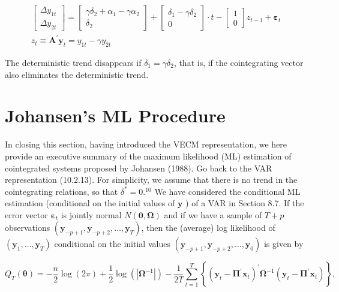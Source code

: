 \documentclass[10pt]{article}
\begin{document}
\begin{gather*}
{\left[\begin{array}{l}
\Delta y_{1 t} \\
\Delta y_{2 t}
\end{array}\right]=\left[\begin{array}{c}
\gamma \delta_{2}+\alpha_{1}-\gamma \alpha_{2} \\
\delta_{2}
\end{array}\right]+\left[\begin{array}{c}
\delta_{1}-\gamma \delta_{2} \\
0
\end{array}\right] \cdot t-\left[\begin{array}{l}
1 \\
0
\end{array}\right] z_{t-1}+\boldsymbol{\varepsilon}_{t}} \\
z_{t} \equiv \mathbf{A}^{\prime} \mathbf{y}_{t}=y_{1 t}-\gamma y_{2 t} \tag{10.2.32}
\end{gather*}


The deterministic trend disappears if $\delta_{1}=\gamma \delta_{2}$, that is, if the cointegrating vector also eliminates the deterministic trend.

\section*{Johansen's ML Procedure}
In closing this section, having introduced the VECM representation, we here provide an executive summary of the maximum likelihood (ML) estimation of cointegrated systems proposed by Johansen (1988). Go back to the VAR representation (10.2.13). For simplicity, we assume that there is no trend in the cointegrating relations, so that $\delta^{*}=0 .^{10}$ We have considered the conditional ML estimation (conditional on the initial values of $\mathbf{y}$ ) of a VAR in Section 8.7. If the error vector $\boldsymbol{\varepsilon}_{t}$ is jointly normal $N(\mathbf{0}, \boldsymbol{\Omega})$ and if we have a sample of $T+p$ observations $\left(\mathbf{y}_{-p+1}, \mathbf{y}_{-p+2}, \ldots, \mathbf{y}_{T}\right)$, then the (average) log likelihood of $\left(\mathbf{y}_{1}, \ldots, \mathbf{y}_{T}\right)$ conditional on the initial values $\left(\mathbf{y}_{-p+1}, \mathbf{y}_{-p+2}, \ldots, \mathbf{y}_{0}\right)$ is given by


\begin{equation*}
Q_{T}(\boldsymbol{\theta})=-\frac{n}{2} \log (2 \pi)+\frac{1}{2} \log \left(\left|\boldsymbol{\Omega}^{-1}\right|\right)-\frac{1}{2 T} \sum_{t=1}^{T}\left\{\left(\mathbf{y}_{t}-\boldsymbol{\Pi}^{\prime} \mathbf{x}_{t}\right)^{\prime} \boldsymbol{\Omega}^{-1}\left(\mathbf{y}_{t}-\boldsymbol{\Pi}^{\prime} \mathbf{x}_{t}\right)\right\}, \tag{10.2.33}
\end{equation*}
\end{document}
